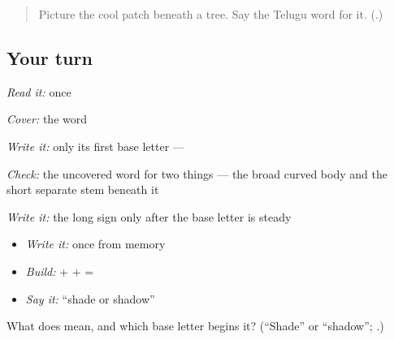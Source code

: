 \label{lesson:TE-R151-chhaya-recall}



\begin{quote}
Picture the cool patch beneath a tree. Say the Telugu word for it. (\textbf{}.)
\end{quote}

\subsection*{Your turn}
\emph{Read it:} \textbf{} once

\emph{Cover:} the word

\emph{Write it:} only its first base letter — \textbf{}

\emph{Check:} the uncovered word for two things — the broad curved body and the short separate stem beneath it

\emph{Write it:} the long \textbf{} sign only after the base letter is steady

\begin{itemize}
\raggedright
  \item \emph{Write it:} \textbf{} once from memory
  \item \emph{Build:} \textbf{} + \textbf{} + \textbf{} = \textbf{}
  \item \emph{Say it:} “shade or shadow”
\end{itemize}

\begin{tcolorbox}[breakable,colback=teal!4,colframe=teal!35!black,title={Before you move on}]
What does \textbf{} mean, and which base letter begins it? (\textquotedblleft{}Shade\textquotedblright{} or \textquotedblleft{}shadow\textquotedblright{}; \textbf{}.)
\end{tcolorbox}
